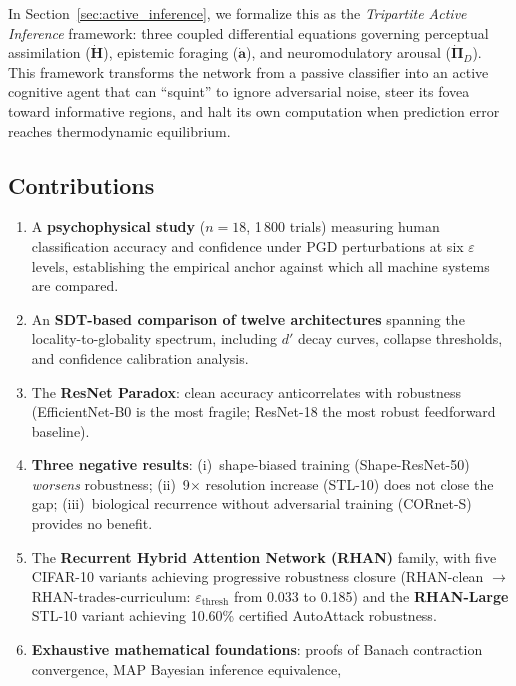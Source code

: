 \documentclass[12pt,a4paper]{article}
\begin{document}
In Section~\ref{sec:active_inference}, we formalize this as the
\textit{Tripartite Active Inference} framework: three coupled differential
equations governing perceptual assimilation ($\dot{\mathbf{H}}$), epistemic
foraging ($\dot{\mathbf{a}}$), and neuromodulatory arousal
($\dot{\bm{\Pi}}_D$). This framework transforms the network from a passive
classifier into an active cognitive agent that can ``squint'' to ignore
adversarial noise, steer its fovea toward informative regions, and halt its
own computation when prediction error reaches thermodynamic equilibrium.

\subsection*{Contributions}

\begin{enumerate}[leftmargin=1.5em]
  \item A \textbf{psychophysical study} ($n{=}18$, 1\,800 trials) measuring
        human classification accuracy and confidence under PGD perturbations
        at six $\varepsilon$ levels, establishing the empirical anchor against
        which all machine systems are compared.
  \item An \textbf{SDT-based comparison of twelve architectures} spanning the
        locality-to-globality spectrum, including $d'$ decay curves, collapse
        thresholds, and confidence calibration analysis.
  \item The \textbf{ResNet Paradox}: clean accuracy anticorrelates with
        robustness (EfficientNet-B0 is the most fragile; ResNet-18 the
        most robust feedforward baseline).
  \item \textbf{Three negative results}: (i)~shape-biased training
        (Shape-ResNet-50) \textit{worsens} robustness; (ii)~9$\times$
        resolution increase (STL-10) does not close the gap; (iii)~biological
        recurrence without adversarial training (CORnet-S) provides no benefit.
  \item The \textbf{Recurrent Hybrid Attention Network (RHAN)} family, with
        five CIFAR-10 variants achieving progressive robustness closure
        (RHAN-clean $\to$ RHAN-trades-curriculum:
        $\varepsilon_{\text{thresh}}$ from 0.033 to 0.185) and the
        \textbf{RHAN-Large} STL-10 variant achieving 10.60\% certified
        AutoAttack robustness.
  \item \textbf{Exhaustive mathematical foundations}: proofs of Banach
        contraction convergence, MAP Bayesian inference equivalence,

\end{enumerate}
\end{document}
